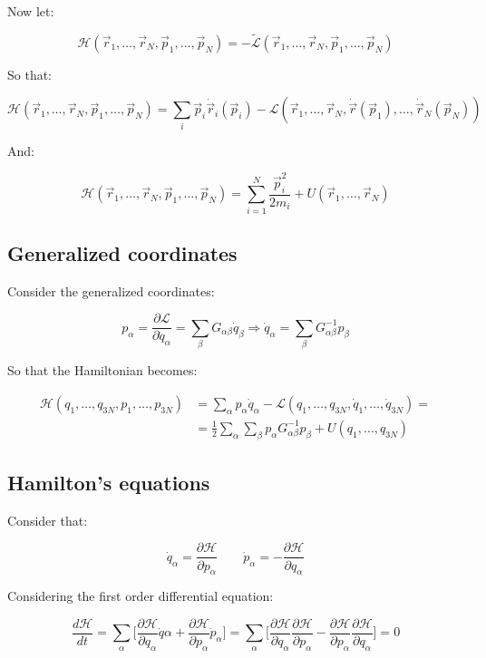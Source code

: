 Now let:

$$\mathcal{H}(\vec{r}_1, \dots, \vec{r}_N, \vec{p}_1, \dots, \vec{p}_N) = -\tilde{\mathcal{L}}(\vec{r}_1, \dots, \vec{r}_N, \vec{p}_1, \dots, \vec{p}_N)$$

So that:

$$\mathcal{H}(\vec{r}_1, \dots, \vec{r}_N, \vec{p}_1, \dots, \vec{p}_N) = \sum\limits_i\vec{p}_i\dot{\vec{r}}_i(\vec{p}_i) - \mathcal{L}(\vec{r}_1, \dots, \vec{r}_N, \dot{\vec{r}}(\vec{p}_1), \dots, \dot{\vec{r}}_N(\vec{p}_N))$$

And:

$$\mathcal{H}(\vec{r}_1, \dots, \vec{r}_N, \vec{p}_1, \dots, \vec{p}_N) = \sum\limits_{i=1}^N\frac{\vec{p}_i^2}{2m_i} + U(\vec{r}_1, \dots, \vec{r}_N)$$

	\subsection{Generalized coordinates}
	Consider the generalized coordinates:

	$$p_\alpha = \frac{\partial\mathcal{L}}{\partial\dot{q}_\alpha} = \sum\limits_\beta G_{\alpha\beta}\dot{q}_\beta\Rightarrow \dot{q}_\alpha = \sum\limits_\beta G^{-1}_{\alpha\beta}p_\beta$$

	So that the Hamiltonian becomes:

	\begin{align*}
		\mathcal{H}(q_1, \dots, q_{3N}, p_1, \dots, p_{3N}) &= \sum\limits_\alpha p_\alpha\dot{q}_\alpha - \mathcal{L}(q_1, \dots, q_{3N}, \dot{q}_1, \dots, \dot{q}_{3N}) =\\
																												&=\frac{1}{2}\sum\limits_\alpha\sum\limits_\beta p_\alpha G_{\alpha\beta}^{-1}p_\beta + U(q_1, \dots, q_{3N})
	\end{align*}

	\subsection{Hamilton's equations}
	Consider that:

	$$\dot{q}_\alpha = \frac{\partial\mathcal{H}}{\partial p_\alpha}\qquad\dot{p}_\alpha = -\frac{\partial\mathcal{H}}{\partial q_\alpha}$$

	Considering the first order differential equation:

	$$\frac{d\mathcal{H}}{dt} = \sum\limits_\alpha\biggl[\frac{\partial\mathcal{H}}{\partial q_\alpha}\dot{q}\alpha + \frac{\partial\mathcal{H}}{\partial p_\alpha}\dot{p}_\alpha\biggr] = \sum\limits_\alpha\biggl[\frac{\partial\mathcal{H}}{\partial q_\alpha}\frac{\partial\mathcal{H}}{\partial p_\alpha} - \frac{\partial\mathcal{H}}{\partial p_\alpha}\frac{\partial\mathcal{H}}{\partial q_\alpha}\biggr] = 0$$

